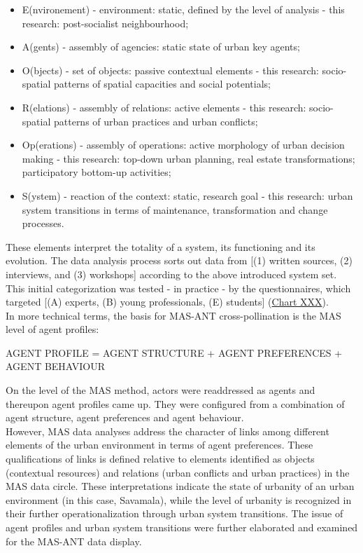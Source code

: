 \documentclass[11pt]{report}
\begin{document}
\begin{itemize}
\item E(nvironement) - environment: static, defined by the level of analysis - this research: post-socialist neighbourhood;
\item A(gents) - assembly of agencies: static state of urban key agents;
\item O(bjects) - set of objects: passive contextual elements - this research: socio-spatial patterns of spatial capacities and social potentials;
\item R(elations) - assembly of relations: active elements - this research: socio-spatial patterns of urban practices and urban conflicts;
\item Op(erations) - assembly of operations: active morphology of urban decision making - this research: top-down urban planning, real estate transformations; participatory bottom-up activities;
\item S(ystem) - reaction of the context: static, research goal - this research:  urban system transitions in terms of maintenance, transformation and change processes.
\end{itemize}

These elements interpret the totality of a system, its functioning and its evolution.
The data analysis process sorts out data from [(1) written sources, (2) interviews, and (3) workshops] according to the above introduced system set.
This initial categorization was tested - in practice - by the questionnaires, which targeted [(A) experts, (B) young professionals, (E) students] (\href{Table data sources}{Chart XXX}).
\\
In more technical terms, the basis for MAS-ANT cross-pollination is the MAS level of agent profiles:

AGENT PROFILE = AGENT STRUCTURE + AGENT PREFERENCES + AGENT BEHAVIOUR

On the level of the MAS method, actors were readdressed as agents and thereupon agent profiles came up. They were configured from a combination of agent structure, agent preferences and agent behaviour.
\\

However, MAS data analyses address the character of links among different elements of the urban environment in terms of agent preferences. These qualifications of links is defined relative to elements identified as objects (contextual resources) and relations (urban conflicts and urban practices) in the MAS data circle. These interpretations indicate the state of urbanity of an urban environment (in this case, Savamala), while the level of urbanity is recognized in their further operationalization through urban system transitions. The issue of agent profiles and urban system transitions were further elaborated and examined for the MAS-ANT data display.
\end{document}
